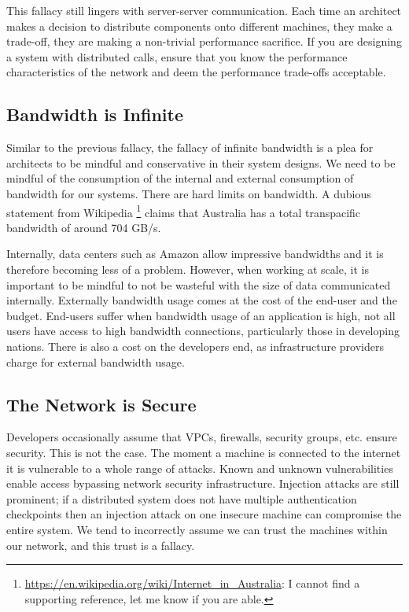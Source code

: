This fallacy still lingers with server-server communication.
Each time an architect makes a decision to distribute components onto different machines,
they make a trade-off,
they are making a non-trivial performance sacrifice.
If you are designing a system with distributed calls,
ensure that you know the performance characteristics of the network and deem the performance trade-offs acceptable.

\subsection{Bandwidth is Infinite}
Similar to the previous fallacy,
the fallacy of infinite bandwidth is a plea for architects to be mindful and conservative in their system designs.
We need to be mindful of the consumption of the internal and external consumption of bandwidth for our systems.
There are hard limits on bandwidth.
A dubious statement from Wikipedia%
\footnote{\url{https://en.wikipedia.org/wiki/Internet_in_Australia}: I cannot find a supporting reference, let me know if you are able.} %
claims that Australia has a total transpacific bandwidth of around 704 GB/s.

Internally, data centers such as Amazon allow impressive bandwidths and it is therefore becoming less of a problem.
However, when working at scale,
it is important to be mindful to not be wasteful with the size of data communicated internally.
Externally bandwidth usage comes at the cost of the end-user and the budget.
End-users suffer when bandwidth usage of an application is high,
not all users have access to high bandwidth connections, particularly those in developing nations.
There is also a cost on the developers end, as infrastructure providers charge for external bandwidth usage.

\subsection{The Network is Secure}
Developers occasionally assume that VPCs, firewalls, security groups, etc. ensure security.
This is not the case.
The moment a machine is connected to the internet it is vulnerable to a whole range of attacks.
Known and unknown vulnerabilities enable access bypassing network security infrastructure.
Injection attacks are still prominent;
if a distributed system does not have multiple authentication checkpoints then an injection attack on one insecure machine can compromise the entire system.
We tend to incorrectly assume we can trust the machines within our network,
and this trust is a fallacy.

